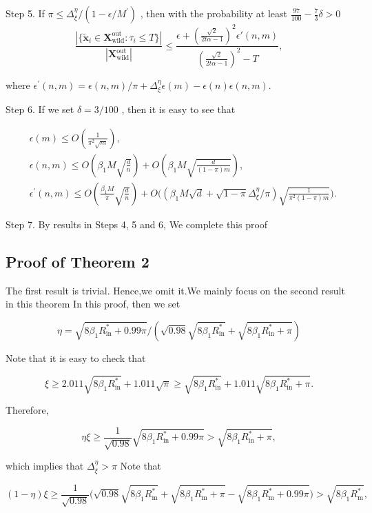 Step 5. If $\pi\leq\Delta_{\xi}^{\eta}/(1-\epsilon/M^{\prime})$ , then with the probability at least $\frac{97}{100}-\frac{7}{3}\delta>0$
\begin{equation}
\frac{|\{\tilde{\mathbf{x}}_{i}\in\boldsymbol{X}_{\mathrm{wild}}^{\mathrm{out}}:\tau_{i}\leq T\}|}{|\boldsymbol{X}_{\mathrm{wild}}^{\mathrm{out}}|}\leq\frac{\epsilon+(\frac{\sqrt{2}}{2t\alpha - 1})^2\epsilon'(n,m)}{(\frac{\sqrt{2}}{2t\alpha - 1})^2-T},
\end{equation}


where $\epsilon^{\prime}(n,m)=\epsilon(n,m)/\pi+\Delta_{\xi}^{\eta}\epsilon(m)-\epsilon(n)\epsilon(n,m).$

Step 6. If we set $\delta=3/100$ , then it is easy to see that

$$\begin{aligned}
&\epsilon(m)\leq O({\frac{1}{\pi^{2}\sqrt{m}}}), \\
&\epsilon(n,m)\leq O(\beta_{1}M\sqrt{\frac{d}{n}})+O(\beta_{1}M\sqrt{\frac{d}{(1-\pi)m}}), \\
&\epsilon^{\prime}(n,m)\leq O(\frac{\beta_{1}M}{\pi}\sqrt{\frac{d}{n}})+O\Big((\beta_{1}M\sqrt{d}+\sqrt{1-\pi}\Delta_{\xi}^{\eta}/\pi)\sqrt{\frac{1}{\pi^{2}(1-\pi)m}}\Big).
\end{aligned}$$

Step 7. By results in Steps 4, 5 and 6, We complete this proof


\subsection{Proof of Theorem 2}
The first result is trivial. Hence,we omit it.We mainly focus on the second result in this theorem In this proof, then we set

$$\eta=\sqrt{8\beta_{1}R_{\mathrm{in}}^{*}+0.99\pi}/(\sqrt{0.98}\sqrt{8\beta_{1}R_{\mathrm{in}}^{*}}+\sqrt{8\beta_{1}R_{\mathrm{in}}^{*}+\pi})$$

Note that it is easy to check that

$$\xi\geq2.011\sqrt{8\beta_{1}R_{\mathrm{in}}^{*}}+1.011\sqrt{\pi}\geq\sqrt{8\beta_{1}R_{\mathrm{in}}^{*}}+1.011\sqrt{8\beta_{1}R_{\mathrm{in}}^{*}+\pi}.$$

Therefore,

$$\eta\xi\geq\frac{1}{\sqrt{0.98}}\sqrt{8\beta_{1}R_{\mathrm{in}}^{*}+0.99\pi}>\sqrt{8\beta_{1}R_{\mathrm{in}}^{*}+\pi},$$

which implies that $\Delta_{\xi}^{\eta}>\pi$ Note that

$$(1-\eta)\xi\geq\frac{1}{\sqrt{0.98}}\big(\sqrt{0.98}\sqrt{8\beta_{1}R_{\mathrm{m}}^{*}}+\sqrt{8\beta_{1}R_{\mathrm{m}}^{*}+\pi}-\sqrt{8\beta_{1}R_{\mathrm{m}}^{*}+0.99\pi}\big)>\sqrt{8\beta_{1}R_{\mathrm{m}}^{*}},$$

